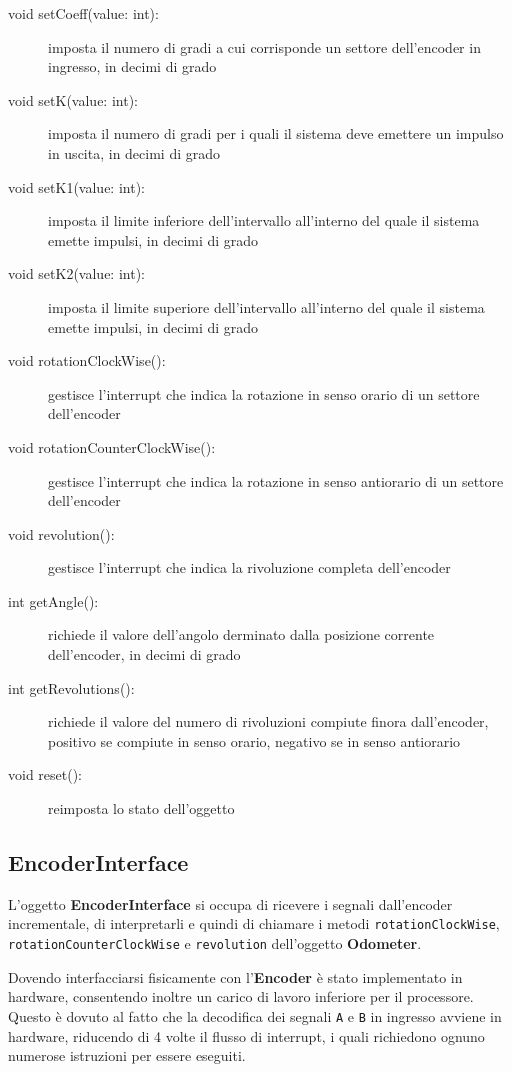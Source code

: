 \documentclass [11pt,a4paper,oneside]{paper}
\newcommand{\component}[1]{\textbf{#1}}
\newcommand{\identifier}[1]{\texttt{#1}}
\begin{document}
\begin{description}
\item[void setCoeff(value: int):] imposta il numero di gradi a
     cui corrisponde un settore dell'encoder in ingresso, in decimi
     di grado
\item[void setK(value: int):] imposta il numero di gradi per i
     quali il sistema deve emettere un impulso in uscita, in decimi
     di grado
\item[void setK1(value: int):] imposta il limite inferiore
     dell'intervallo all'interno del quale il sistema emette impulsi,
     in decimi di grado
\item[void setK2(value: int):] imposta il limite superiore 
     dell'intervallo all'interno del quale il sistema emette impulsi,
     in decimi di grado
\item[void rotationClockWise():] gestisce l'interrupt che indica la
     rotazione in senso orario di un settore dell'encoder
\item[void rotationCounterClockWise():] gestisce l'interrupt che indica
     la rotazione in senso antiorario di un settore dell'encoder
\item[void revolution():] gestisce l'interrupt che indica la
     rivoluzione completa dell'encoder
\item[int getAngle():] richiede il valore dell'angolo derminato
     dalla posizione corrente dell'encoder, in decimi di grado
\item[int getRevolutions():] richiede il valore del numero di rivoluzioni
    compiute finora dall'encoder, positivo se compiute in senso orario,
    negativo se in senso antiorario
\item[void reset():] reimposta lo stato dell'oggetto
\end{description}

\subsection{EncoderInterface}
L'oggetto \component{EncoderInterface} si occupa di ricevere i segnali
dall'encoder incrementale, di interpretarli e quindi di chiamare i
metodi \identifier{rotationClockWise}, \identifier{rotationCounterClockWise}
e \identifier{revolution} dell'oggetto \component{Odometer}.

Dovendo interfacciarsi fisicamente con l'\component{Encoder} è stato
implementato in hardware, consentendo inoltre un carico di lavoro
inferiore per il processore. Questo è dovuto al fatto che la
decodifica dei segnali \identifier{A} e \identifier{B}
in ingresso avviene in hardware, riducendo di 4 volte il flusso di
interrupt, i quali richiedono ognuno numerose istruzioni per
essere eseguiti.
\end{document}
